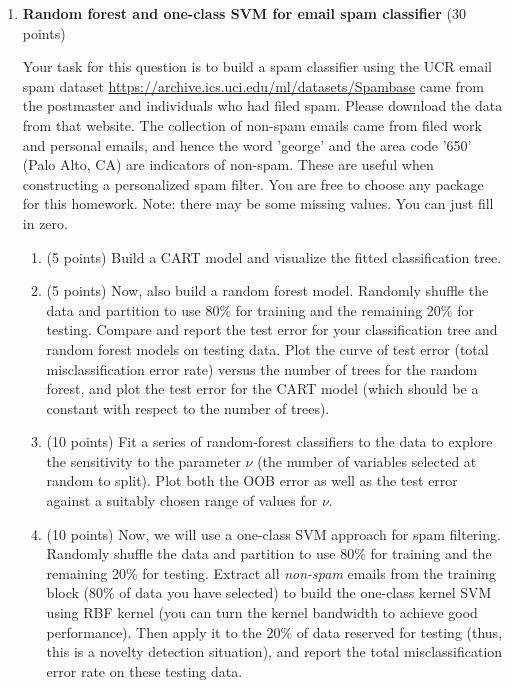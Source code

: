\documentclass[twoside,10pt]{article}
\begin{document}
\begin{enumerate}
\clearpage

\item {\bf Random forest and one-class SVM for email spam classifier} (30 points)

Your task for this question is to build a spam classifier using the UCR email spam dataset \url{https://archive.ics.uci.edu/ml/datasets/Spambase} came from the postmaster and individuals who had filed spam. Please download the data from that website. The collection of non-spam emails came from filed work and personal emails, and hence the word \textsf{'george'} and the area code \textsf{'650'} (Palo Alto, CA) are indicators of non-spam. These are useful when constructing a personalized spam filter. You are free to choose any package for this homework. Note: there may be some missing values. You can just fill in zero.

\begin{enumerate}

\item (5 points) Build a CART model and visualize the fitted classification tree.

\item (5 points) Now, also build a random forest model. Randomly shuffle the data and partition to use  80\% for training and the remaining 20\% for testing. Compare and report the test error for your classification tree and random forest models on testing data. Plot the curve of test error (total misclassification error rate) versus the number of trees for the random forest, and plot the test error for the CART model (which should be a constant with respect to the number of trees). 


\item (10 points) Fit a series of random-forest classifiers to the data to explore the sensitivity to the parameter $\nu$ (the number of variables selected at random to split). Plot both the OOB error as well as the test error against a suitably chosen range of values for $\nu$.

\item (10 points) Now, we will use a one-class SVM approach for spam filtering. Randomly shuffle the data and partition to use  80\% for training and the remaining 20\% for testing. Extract all {\it non-spam} emails from the training block (80\% of data you have selected) to build the one-class kernel SVM using RBF kernel (you can turn the kernel bandwidth to achieve good performance). Then apply it to the 20\% of data reserved for testing (thus, this is a novelty detection situation), and report the total misclassification error rate on these testing data. 


\end{enumerate}
\end{enumerate}
\end{document}
